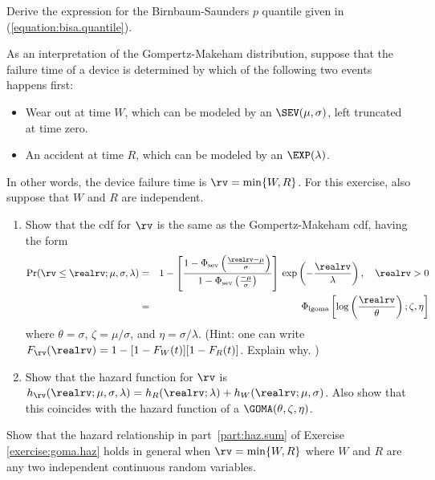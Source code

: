 \begin{exercise1}
Derive the expression for the Birnbaum-Saunders $p$ quantile
given in (\ref{equation:bisa.quantile}).
\end{exercise1}

\begin{exercise1}
\label{exercise:goma.haz}
As an interpretation of the Gompertz-Makeham distribution, suppose
that the failure time of a device is determined by which of the
following two events happens first:
\begin{itemize}
\item
Wear out at time $W$,  which can be
modeled by an $\SEV(\mu, \sigma)$, left truncated at time zero.
\item
An accident at time $R$, which can be modeled by
an $\EXP(\lambda)$.
\end{itemize}
In other words, the device
failure time is $\rv=\min\{W,R\}$.
For this exercise, also suppose that $W$ and $R$ are independent.
\begin{enumerate}
\item 
Show that the cdf for $\rv$ is the same as the Gompertz-Makeham cdf,
having the form
\begin{eqnarray*}
\Pr(\rv \le \realrv; \mu, \sigma, \lambda)&=&
1- 
 \left [
 \frac{
   1-\Phi_{\rm sev}
  \left  (
   \frac{\realrv-\mu}{\sigma}
  \right )
      }
      {
   1-\Phi_{\rm sev}
  \left  (
   \frac{-\mu}{\sigma}
  \right )
      }
\right ]\, \exp \left ( -\frac{\realrv}{\lambda}
\right ), \quad \realrv > 0
\\
&=&
\Phi_{\rm lgoma} \left [\log \left ( \frac{\realrv}{\theta} \right ) ; \zeta, \eta \right ]
\end{eqnarray*}
where $\theta=\sigma$, $\zeta=\mu/\sigma$, and
$\eta=\sigma/\lambda$.  (Hint: one can write
$F_{\rv}(\realrv)=1-[1-F_{W}(t)][1-F_{R}(t)]$. Explain why.  )
\item 
\label{part:haz.sum}
Show that the hazard function for $\rv$ is $h_{\rv}(\realrv; \mu, \sigma,
\lambda)=h_{R}(\realrv; \lambda)+ h_{W}(\realrv; \mu,\sigma)$. Also
show that this coincides with the hazard function of a
$\GOMA(\theta,\zeta,
\eta)$.
\end{enumerate}
\end{exercise1}

\begin{exercise1}
Show that the hazard relationship in part~\ref{part:haz.sum} of
Exercise~ \ref{exercise:goma.haz} holds in general when $\rv=\min
\{W, R\}$ where $W$ and $R$ are any two independent continuous
random variables.
\end{exercise1}

